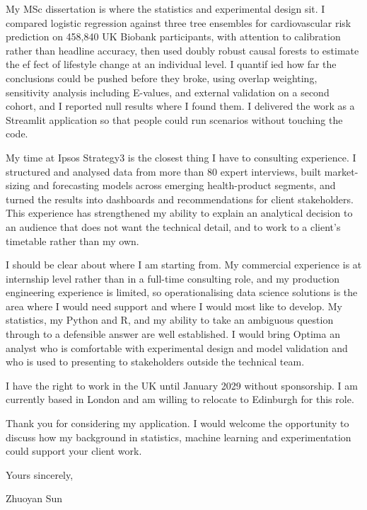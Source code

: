 \documentclass[letterpaper,11pt]{article}
\begin{document}
My MSc dissertation is where the statistics and experimental design sit. I compared logistic regression against three tree ensembles for cardiovascular risk prediction on 458,840 UK Biobank participants, with attention to calibration rather than headline accuracy, then used doubly robust causal forests to estimate the ef\kern0pt fect of lifestyle change at an individual level. I quantif\kern0pt ied how far the conclusions could be pushed before they broke, using overlap weighting, sensitivity analysis including E-values, and external validation on a second cohort, and I reported null results where I found them. I delivered the work as a Streamlit application so that people could run scenarios without touching the code.

My time at Ipsos Strategy3 is the closest thing I have to consulting experience. I structured and analysed data from more than 80 expert interviews, built market-sizing and forecasting models across emerging health-product segments, and turned the results into dashboards and recommendations for client stakeholders. This experience has strengthened my ability to explain an analytical decision to an audience that does not want the technical detail, and to work to a client's timetable rather than my own.

I should be clear about where I am starting from. My commercial experience is at internship level rather than in a full-time consulting role, and my production engineering experience is limited, so operationalising data science solutions is the area where I would need support and where I would most like to develop. My statistics, my Python and R, and my ability to take an ambiguous question through to a defensible answer are well established. I would bring Optima an analyst who is comfortable with experimental design and model validation and who is used to presenting to stakeholders outside the technical team.

I have the right to work in the UK until January 2029 without sponsorship. I am currently based in London and am willing to relocate to Edinburgh for this role.

Thank you for considering my application. I would welcome the opportunity to discuss how my background in statistics, machine learning and experimentation could support your client work.

\vspace{2pt}
Yours sincerely,

\vspace{8pt}
Zhuoyan Sun
\end{document}
